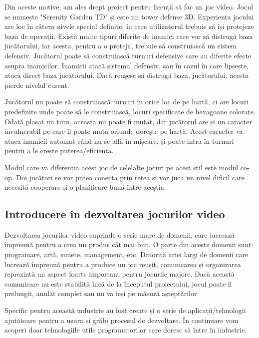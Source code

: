 \documentclass[12pt, a4paper]{article}
\begin{document}
	Din aceste motive, am ales drept proiect pentru licență să fac un joc video. Jocul se numește "Serenity Garden TD" și este un tower defense 3D. Experiența jocului are loc în câteva nivele special definite, în care utilizatorul trebuie să își protejeze baza de operații. Există multe tipuri diferite de inamici care vor să distrugă baza jucătorului, iar acesta, pentru a o proteja, trebuie să construiască un sistem defensiv. Jucătorul poate să construiască turnuri defensive care au diferite efecte asupra inamicilor. Inamicii atacă sistemul defensiv, sau în cazul în care lipsește, atacă direct baza jucătorului. Dacă reușesc să distrugă baza, jucătorului, acesta pierde nivelul curent.
	\newline
	
	Jucătorul nu poate să construiască turnuri în orice loc de pe hartă, ci are locuri predefinite unde poate să le construiască, locuri specificate de hexagoane colorate. Odată plasat un turn, aceasta nu poate fi mutat, dar jucătorul are și un caracter invulnerabil pe care îl poate muta oriunde dorește pe hartă. Acest caracter va ataca inamicii automat când nu se află în mișcare, și poate intra în turnuri pentru a le crește puterea/eficiența.
	\newline
	
	Modul care va diferenția acest joc de celelalte jocuri pe acest stil este modul co-op. Doi jucători se vor putea conecta prin rețea și vor juca un nivel dificil care necesită cooperare și o planificare bună între aceștia.
	
	
	
	
	
	\subsection{Introducere în dezvoltarea jocurilor video}
	
	Dezvoltarea jocurilor video cuprinde o serie mare de domenii, care lucrează împreună pentru a crea un produs cât mai bun. O parte din aceste domenii sunt: programare, artă, sunete, management, etc. Datorită ariei largi de domenii care lucrează împreună pentru a produce un joc reușit, cominicarea și organizarea reprezintă un aspect foarte important pentru jocurile majore. Dacă această comunicare nu este stabilită încă de la începutul proiectului, jocul poate fi prelungit, anulat complet sau nu va ieși pe măsură așteptărilor.
	\newline
	
	Specific pentru această industrie au fost create și o serie de aplicații/tehnologii ajutătoare pentru a ușura și grăbi procesul de dezvoltare. În continuare vom acoperi doar tehnologiile utile programatorilor care doresc să între în industrie.
	\newline
	
\end{document}
